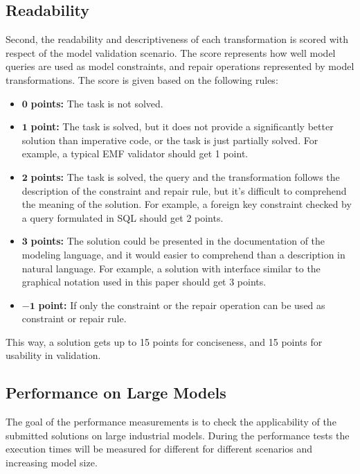 \documentclass[submission,copyright,creativecommons]{eptcs}
\begin{document}
\noindent{}

\subsection{Readability}

Second, the readability and descriptiveness of each transformation is scored with respect of the model validation scenario. The score represents how well model queries are used as model constraints, and repair operations represented by model transformations. The score is given based on the following rules:
\begin{itemize}
  \item $\mathbf{0}$   \textbf{points:} The task is not solved.
  \item $\mathbf{1}$   \textbf{point:} The task is solved, but it does not provide a significantly better solution than imperative code, or the task is just partially solved. For example, a typical EMF validator should get 1 point.
  \item $\mathbf{2}$   \textbf{points:} The task is solved, the query and the transformation follows the description of the constraint and repair rule, but it's difficult to comprehend the meaning of the solution. For example, a foreign key constraint checked by a query formulated in SQL should get 2 points.
  \item $\mathbf{3}$   \textbf{points:} The solution could be presented in the documentation of the modeling language, and it would easier to comprehend than a description in natural language. For example, a solution with interface similar to the graphical notation used in this paper should get 3 points.
  \item $\mathbf{-1}$  \textbf{point:} If only the constraint or the repair operation can be used as constraint or repair rule.
\end{itemize}

This way, a solution gets up to 15 points for conciseness, and 15 points for usability in validation.

\noindent{}

\subsection{Performance on Large Models}
The goal of the performance measurements is to check the applicability of the submitted solutions on large industrial models. During the performance tests the execution times will be measured for different for different scenarios and increasing model size.
\end{document}
